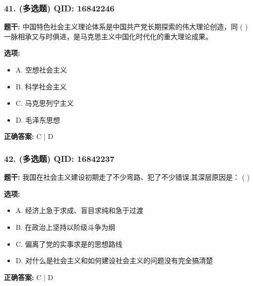 \documentclass[12pt,UTF8]{ctexart}
\begin{document}
\vspace{0.3em}\hrulefill\vspace{0.7em}

\subsubsection*{41. (多选题) \small QID: 16842246}

\textbf{题干:}
中国特色社会主义理论体系是中国共产党长期探索的伟大理论创造，同 ( ) 一脉相承又与时俱进，是马克思主义中国化时代化的重大理论成果。

\textbf{选项:}
\begin{itemize}[leftmargin=*]

  \item A. 空想社会主义

  \item B. 科学社会主义

  \item C. 马克思列宁主义

  \item D. 毛泽东思想

\end{itemize}

\textbf{正确答案:}
C | D

\vspace{0.3em}\hrulefill\vspace{0.7em}

\subsubsection*{42. (多选题) \small QID: 16842237}

\textbf{题干:}
我国在社会主义建设初期走了不少弯路、犯了不少错误,其深层原因是： ( )

\textbf{选项:}
\begin{itemize}[leftmargin=*]

  \item A. 经济上急于求成、盲目求纯和急于过渡

  \item B. 在政治上坚持以阶级斗争为纲

  \item C. 偏离了党的实事求是的思想路线

  \item D. 对什么是社会主义和如何建设社会主义的问题没有完全搞清楚

\end{itemize}

\textbf{正确答案:}
C | D
\end{document}
